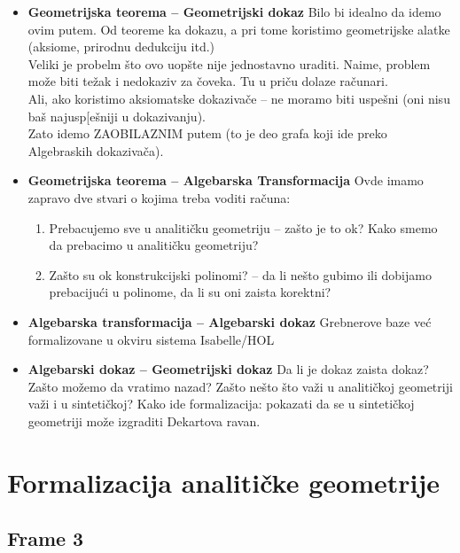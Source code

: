 \documentclass{article}
\begin{document}
\begin{itemize}
\item {\bf Geometrijska teorema -- Geometrijski dokaz} Bilo bi idealno da idemo ovim putem. Od teoreme ka dokazu, a pri tome koristimo geometrijske alatke (aksiome, 
      prirodnu dedukciju itd.) \\
      Veliki je probelm \v sto ovo uop\v ste nije jednostavno uraditi. Naime, problem mo\v ze biti te\v zak i nedokaziv za \v coveka.
      Tu u pri\v cu dolaze ra\v cunari. \\
      Ali, ako koristimo aksiomatske dokaziva\v ce -- ne moramo biti uspe\v sni (oni nisu ba\v s najusp[e\v sniji u dokazivanju). \\
      Zato idemo ZAOBILAZNIM putem (to je deo grafa koji ide preko Algebraskih dokaziva\v ca).
      
\item {\bf Geometrijska teorema -- Algebarska Transformacija} Ovde imamo zapravo dve stvari o kojima treba voditi ra\v cuna:
  \begin{enumerate}
  \item Prebacujemo sve u analiti\v cku geometriju -- za\v sto je to ok? Kako smemo da prebacimo u analiti\v cku geometriju?
  \item Za\v sto su ok konstrukcijski polinomi? -- da li ne\v sto gubimo ili dobijamo prebaciju\'ci u polinome, da li su oni zaista korektni?
  \end{enumerate}

\item {\bf Algebarska transformacija -- Algebarski dokaz} Grebnerove baze ve\'c formalizovane u okviru sistema Isabelle/HOL

\item {\bf Algebarski dokaz -- Geometrijski dokaz} Da li je dokaz zaista dokaz? Za\v sto mo\v zemo da vratimo nazad? Za\v sto ne\v sto 
      \v sto va\v zi u analiti\v ckoj geometriji va\v zi i u sinteti\v ckoj? Kako ide formalizacija: pokazati da se u sinteti\v ckoj geometriji
      mo\v ze izgraditi Dekartova ravan.
     
\end{itemize}

\section{Formalizacija analiti\v cke geometrije}

\subsection{Frame 3}
\end{document}
